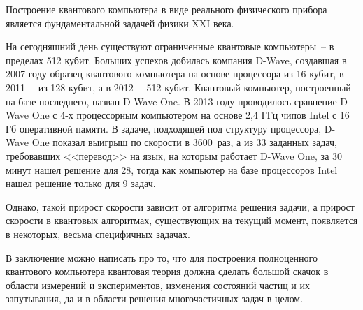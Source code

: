 \documentclass[pscyr,notitlepage]{hedwork}
\renewcommand{\~}[1]{\widetilde{#1}}
\begin{document}
  Построение квантового компьютера в виде реального физического прибора
  является фундаментальной задачей физики XXI века.
  
  На сегодняшний день существуют ограниченные квантовые компьютеры~-- в
  пределах 512 кубит. Больших успехов добилась компания D-Wave, создавшая
  в 2007 году образец квантового компьютера на основе процессора из 16 кубит,
  в 2011~-- из 128 кубит, а в 2012~-- 512 кубит. Квантовый компьютер,
  построенный на базе последнего, назван D-Wave One. В 2013 году проводилось
  сравнение D-Wave One с 4-х процессорным компьютером на основе 2,4 ГГц чипов
  Intel с 16 Гб оперативной памяти. В задаче, подходящей под структуру
  процессора, D-Wave One показал выигрыш по скорости в 3600~раз, а из 33
  заданных задач, требовавших <<перевод>> на язык, на которым работает
  D-Wave One, за 30 минут нашел решение для 28, тогда как компьютер на
  базе процессоров Intel нашел решение только для 9 задач.
  
  Однако, такой прирост скорости зависит от алгоритма решения задачи, а
  прирост скорости в квантовых алгоритмах, существующих на текущий момент,
  появляется в некоторых, весьма специфичных задачах.
  
  В заключение можно написать про то, что для построения полноценного квантового
  компьютера квантовая теория должна сделать большой скачок в области измерений
  и экспериментов, изменения состояний частиц и их запутывания, да и в
  области решения многочастичных задач в целом.

  \newpage
\end{document}

